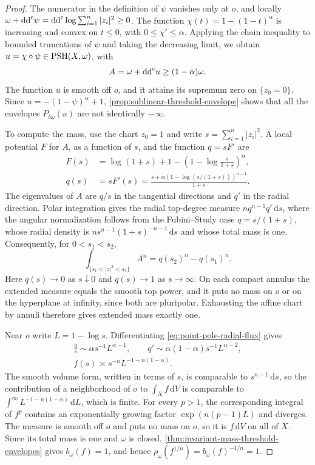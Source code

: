 \begin{proof}
The numerator in the definition of $\psi$ vanishes only at $o$, and locally $\omega+\mathrm{dd}^{\mathrm{c}}\psi=\mathrm{dd}^{\mathrm{c}}\log\sum_{i=1}^n|z_i|^2\geq0$. The function $\chi(t)=1-(1-t)^\alpha$ is increasing and convex on $t\leq0$, with $0\leq\chi'\leq\alpha$. Applying the chain inequality to bounded truncations of $\psi$ and taking the decreasing limit, we obtain $u=\chi\circ\psi\in\mathrm{PSH}(X,\omega)$, with
\[
 A=\omega+\mathrm{dd}^{\mathrm{c}} u\geq(1-\alpha)\omega.
\]
The function $u$ is smooth off $o$, and it attains its supremum zero on $\{z_0=0\}$. Since $u=-(1-\psi)^\alpha+1$, \cref{prop:sublinear-threshold-envelope} shows that all the envelopes $P_{\delta\omega}(u)$ are not identically $-\infty$.

To compute the mass, use the chart $z_0=1$ and write $s=\sum_{i=1}^n|z_i|^2$. A local potential $F$ for $A$, as a function of $s$, and the function $q=sF'$ are
\begin{equation}\label{eq:point-pole-radial-flux}
 \begin{aligned}
 F(s)&=\log(1+s)+1-\left(1-\log\frac{s}{1+s}\right)^\alpha,\\
 q(s)&=sF'(s)=\frac{s+\alpha(1-\log(s/(1+s)))^{\alpha-1}}{1+s}.
 \end{aligned}
\end{equation}
The eigenvalues of $A$ are $q/s$ in the tangential directions and $q'$ in the radial direction. Polar integration gives the radial top-degree measure $nq^{n-1}q'\,\mathrm{d}s$, where the angular normalization follows from the Fubini--Study case $q=s/(1+s)$, whose radial density is $ns^{n-1}(1+s)^{-n-1}\,\mathrm{d}s$ and whose total mass is one. Consequently, for $0<s_1<s_2$,
\[
 \int_{\{s_1<|z|^2<s_2\}}A^n=q(s_2)^n-q(s_1)^n.
\]
Here $q(s)\to0$ as $s\downarrow0$ and $q(s)\to1$ as $s\to\infty$. On each compact annulus the extended measure equals the smooth top power, and it puts no mass on $o$ or on the hyperplane at infinity, since both are pluripolar. Exhausting the affine chart by annuli therefore gives extended mass exactly one.

Near $o$ write $L=1-\log s$. Differentiating \eqref{eq:point-pole-radial-flux} gives
\[
 \begin{gathered}
 \frac qs\sim\alpha s^{-1}L^{\alpha-1},\qquad
 q'\sim\alpha(1-\alpha)s^{-1}L^{\alpha-2},\\
 f(s)\asymp s^{-n}L^{-1-n(1-\alpha)}.
 \end{gathered}
\]
The smooth volume form, written in terms of $s$, is comparable to $s^{n-1}\,\mathrm{d}s$, so the contribution of a neighborhood of $o$ to $\int_Xf\,\mathrm{d}V$ is comparable to $\int^\infty L^{-1-n(1-\alpha)}\,\mathrm{d}L$, which is finite. For every $p>1$, the corresponding integral of $f^p$ contains an exponentially growing factor $\exp(n(p-1)L)$ and diverges. The measure is smooth off $o$ and puts no mass on $o$, so it is $f\,\mathrm{d}V$ on all of $X$. Since its total mass is one and $\omega$ is closed, \cref{thm:invariant-mass-threshold-envelopes} gives $b_\omega(f)=1$, and hence $\rho_\omega(f^{1/n})=b_\omega(f)^{-1/n}=1$.


\end{proof}
